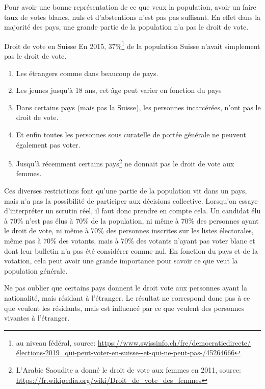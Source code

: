 \documentclass[../report]{subfiles}
\begin{document}
  Pour avoir une bonne représentation de ce que veux la population, avoir un faire taux de votes
  blancs, nuls et d'abstentions n'est pas pas suffisant.
  En effet dans la majorité des pays, une grande partie de la population n'a pas le droit de vote.

  \begin{nota}{Droit de vote en Suisse}
    En 2015, 37\%\footnote{au niveau fédéral, source: \url{https://www.swissinfo.ch/fre/democratiedirecte/élections-2019\_qui-peut-voter-en-suisse--et-qui-ne-peut-pas-/45264666}}
    de la population Suisse n'avait simplement pas le droit de vote.
    \begin{enumerate}
      \item Les étrangers comme dans beaucoup de pays.
      \item Les jeunes jusqu'à 18 ans, cet âge peut varier en fonction du pays
      \item Dans certains pays (mais pas la Suisse), les personnes incarcérées, n'ont pas 
        le droit de vote.
      \item Et enfin toutes les personnes sous curatelle de portée générale ne peuvent 
        également pas voter.
      \item Jusqu'à récemment certains pays\footnote{L'Arabie Saoudite a donné le droit de vote aux femmes en 2011, source: \url{https://fr.wikipedia.org/wiki/Droit\_de\_vote\_des\_femmes}} ne donnait pas le droit de vote aux femmes.
    \end{enumerate}
  \end{nota}

  Ces diverses restrictions font qu'une partie de la population vit dans un pays, mais n'a
  pas la possibilité de participer aux décisions collective.
  Lorsqu'on essaye d'interpréter un scrutin réel, il faut donc prendre en compte cela.
  Un candidat élu à 70\% n'est pas élus à 70\% de la population, ni même à 70\% des personnes
  ayant le droit de vote, ni même à 70\% des personnes inscrites sur les listes électorales,
  même pas à 70\% des votants, mais à 70\% des votants n'ayant pas voter blanc et dont leur 
  bulletin n'a pas été considérer comme nul.
  En fonction du pays et de la votation, cela peut avoir une grande importance pour savoir ce que
  veut la population générale.

  Ne pas oublier que certains pays donnent le droit vote aux personnes ayant la nationalité, mais 
  résidant à l'étranger.
  Le résultat ne correspond donc pas à ce que veulent les résidants, mais est influencé par ce
  que veulent des personnes vivantes à l'étranger.
\end{document}
